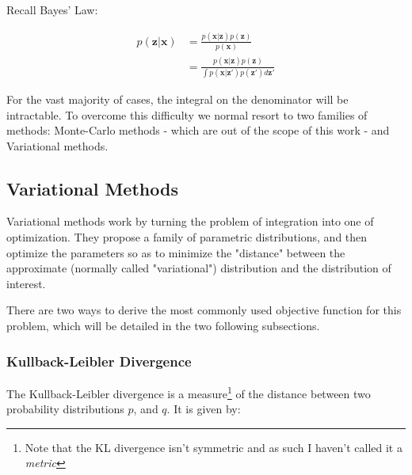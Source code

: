 Recall Bayes' Law:

\begin{align}
    p(\bm{z}|\bm{x}) &= \frac{p(\bm{x}|\bm{z})p(\bm{z})}{p(\bm{x})} \\
                     &= \frac{p(\bm{x}|\bm{z})p(\bm{z})}{\int p(\bm{x}|\bm{z'})p(\bm{z'}) d\bm{z'}}
\end{align}

For the vast majority of cases, the integral on the denominator will be
intractable. To overcome this difficulty we normal resort to two families
of methods: Monte-Carlo methods - which are out of the scope of this work -
and Variational methods.
%
%

\subsection{Variational Methods}
\label{subsection:variational}
Variational methods work by turning the problem of integration into one of
optimization. They propose a family of parametric distributions, and then
optimize the parameters so as to minimize the "distance" between the approximate
(normally called "variational") distribution and the distribution of interest.

There are two ways to derive the most commonly used objective function for
this problem, which will be detailed in the two following subsections.

\subsubsection{Kullback-Leibler Divergence}
\label{subsubsection:kldiv}

The Kullback-Leibler divergence is a measure\footnote{Note that the KL divergence
isn't symmetric and as such I haven't called it a \emph{metric}} of the distance
between two probability distributions $p$, and $q$. It is given by:

